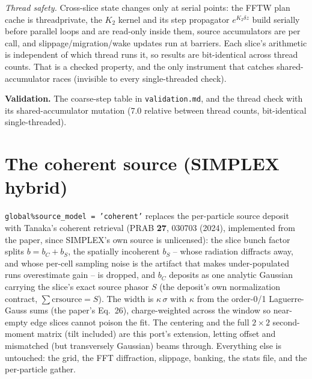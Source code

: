 \documentclass[11pt]{article}
\newcommand{\code}[1]{\texttt{#1}}
\newenvironment{validation}{\par\small\textbf{Validation.}}{\par}
\begin{document}
\emph{Thread safety.} Cross-slice state changes only at serial points: the FFTW plan
cache is threadprivate, the $K_2$ kernel and its step propagator $e^{K_2\delta z}$
build serially before parallel loops and are read-only inside them, source
accumulators are per call, and slippage/migration/wake updates run at barriers. Each slice's arithmetic is independent of which thread runs
it, so results are bit-identical across thread counts. That is a checked property, and
the only instrument that catches shared-accumulator races (invisible to every
single-threaded check).

\begin{validation}
The coarse-step table in \code{validation.md}, and the
thread check with its shared-accumulator mutation (7.0 relative between thread counts,
bit-identical single-threaded).
\end{validation}

\section{The coherent source (SIMPLEX hybrid)}\label{sec:coherent-source}

\texttt{global\%source\_model = 'coherent'} replaces the per-particle source deposit
with Tanaka's coherent retrieval (PRAB \textbf{27}, 030703 (2024), implemented from
the paper, since SIMPLEX's own source is unlicensed): the slice bunch factor splits
$b = b_C + b_S$, the spatially incoherent $b_S$ -- whose radiation diffracts away,
and whose per-cell sampling noise is the artifact that makes under-populated runs
overestimate gain -- is dropped, and $b_C$ deposits as one analytic Gaussian carrying
the slice's exact source phasor $S$ (the deposit's own normalization contract,
$\sum \mathrm{crsource} = S$). The width is $\kappa\,\sigma$ with $\kappa$ from the
order-0/1 Laguerre-Gauss sums (the paper's Eq.~26), charge-weighted across the window
so near-empty edge slices cannot poison the fit. The centering and the full
$2\times2$ second-moment matrix (tilt included) are this port's extension, letting
offset and mismatched (but transversely Gaussian) beams through. Everything else
is untouched: the grid, the FFT diffraction, slippage, banking, the stats file, and
the per-particle gather.
\end{document}

